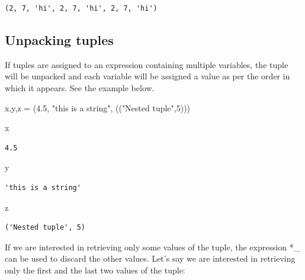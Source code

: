 \documentclass[
  letterpaper,
  DIV=11,
  numbers=noendperiod]{scrreprt}
\newenvironment{Shaded}{\begin{snugshade}}{\end{snugshade}}
\newcommand{\DecValTok}[1]{\textcolor[rgb]{0.68,0.00,0.00}{#1}}
\newcommand{\FloatTok}[1]{\textcolor[rgb]{0.68,0.00,0.00}{#1}}
\newcommand{\NormalTok}[1]{\textcolor[rgb]{0.00,0.23,0.31}{#1}}
\newcommand{\OperatorTok}[1]{\textcolor[rgb]{0.37,0.37,0.37}{#1}}
\newcommand{\StringTok}[1]{\textcolor[rgb]{0.13,0.47,0.30}{#1}}
\begin{document}
\begin{verbatim}
(2, 7, 'hi', 2, 7, 'hi', 2, 7, 'hi')
\end{verbatim}

\hypertarget{unpacking-tuples}{%
\subsection{Unpacking tuples}\label{unpacking-tuples}}

If tuples are assigned to an expression containing multiple variables,
the tuple will be unpacked and each variable will be assigned a value as
per the order in which it appears. See the example below.

\begin{Shaded}
\begin{Highlighting}[]
\NormalTok{x,y,z  }\OperatorTok{=}\NormalTok{ (}\FloatTok{4.5}\NormalTok{, }\StringTok{"this is a string"}\NormalTok{, ((}\StringTok{"Nested tuple"}\NormalTok{,}\DecValTok{5}\NormalTok{)))}
\end{Highlighting}
\end{Shaded}

\begin{Shaded}
\begin{Highlighting}[]
\NormalTok{x}
\end{Highlighting}
\end{Shaded}

\begin{verbatim}
4.5
\end{verbatim}

\begin{Shaded}
\begin{Highlighting}[]
\NormalTok{y}
\end{Highlighting}
\end{Shaded}

\begin{verbatim}
'this is a string'
\end{verbatim}

\begin{Shaded}
\begin{Highlighting}[]
\NormalTok{z}
\end{Highlighting}
\end{Shaded}

\begin{verbatim}
('Nested tuple', 5)
\end{verbatim}

If we are interested in retrieving only some values of the tuple, the
expression *\_ can be used to discard the other values. Let's say we are
interested in retrieving only the first and the last two values of the
tuple:
\end{document}
